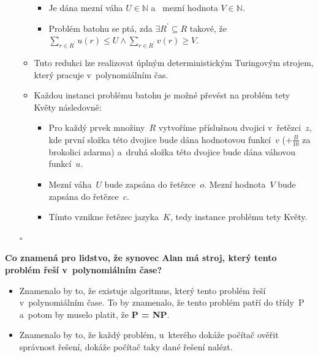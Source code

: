 \documentclass[a4paper, 11pt, fleqn]{scrartcl}
\newcommand*{\QEDB}{\hfill\ensuremath{\square}}
\begin{document}
\begin{enumerate}
\begin{itemize}
\begin{itemize}
						\item
							Je dána mezní váha $ U \in \mathbb{N} $
							a~ mezní hodnota $ V \in \mathbb{N} $.

						\item
							Problém batohu se ptá, zda $ \exists
							R^\prime \subseteq R $ takové, že
							$ \sum\limits_{r \in R^\prime} u(r) \leq U
							\wedge \sum\limits_{r \in R^\prime} v(r)
							\geq V $.
					\end{itemize}

				\item
					Tuto redukci lze realizovat úplným deterministickým
					Turingovým strojem, který pracuje v~polynomiálním
					čas.

				\item
					Každou instanci problému batohu je možné převést
					na problém tety Květy následovně:

					\begin{itemize}
						\item
							Pro každý prvek množiny~$ R $ vytvoříme
							příslušnou dvojici v~řetězci~$ z $, kde
							první složka této dvojice bude dána
							hodnotovou funkcí~$ v $ ($ + \frac{B}{10} $
							za brokolici zdarma) a~druhá složka této
							dvojice bude dána váhovou funkcí~$ u $.

						\item
							Mezní váha~$ U $ bude zapsána do
							řetězce~$ o $. Mezní hodnota~$ V $ bude
							zapsána do řetězce~$ c $.

						\item
							Tímto vznikne řetězec jazyka~$ K $, tedy
							instance problému tety Květy.
					\end{itemize}
			\end{itemize}

			\QEDB
	\end{enumerate}

	\textbf{Co znamená pro lidstvo, že synovec Alan má stroj, který tento
	problém řeší v~polynomiálním čase?}
	\begin{itemize}
		\item
			Znamenalo by to, že existuje algoritmus, který tento problém
			řeší v~polynomiálním čase. To by znamenalo, že tento problém
			patří do třídy~P a~potom by muselo platit, že \textbf{P = NP}.

		\item
			Znamenalo by to, že každý problém, u~kterého dokáže počítač
			 ověřit správnost řešení, dokáže počítač taky
			dané řešení  nalézt.
	\end{itemize}
\end{document}
